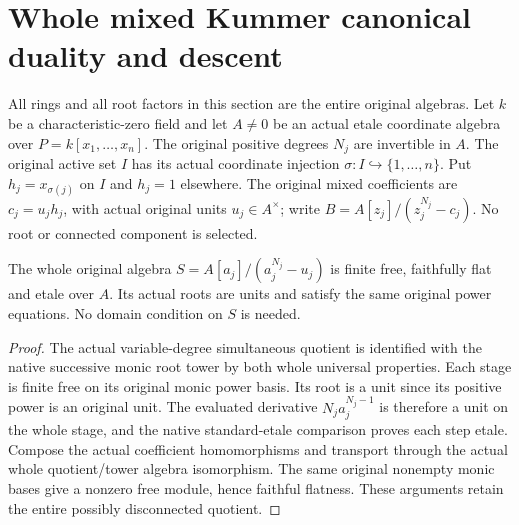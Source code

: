 \section{Whole mixed Kummer canonical duality and descent}
\label{sec:kn-nadel-canonical-mixed}

All rings and all root factors in this section are the entire original
algebras.  Let $k$ be a characteristic-zero field and let $A\ne0$ be an
actual etale coordinate algebra over $P=k[x_1,\ldots,x_n]$.  The original
positive degrees $N_j$ are invertible in $A$.  The original active set
$I$ has its actual coordinate injection $\sigma:I\hookrightarrow\{1,\ldots,n\}$.
Put $h_j=x_{\sigma(j)}$ on $I$ and $h_j=1$ elsewhere.  The original mixed
coefficients are $c_j=u_jh_j$, with actual original units $u_j\in A^\times$;
write $B=A[z_j]/(z_j^{N_j}-c_j)$.  No root or connected component is selected.

\begin{theorem}
\label{thm:kn-nadel-canonical-mixed-unit-cover}
\leanok
{}
The whole original algebra $S=A[a_j]/(a_j^{N_j}-u_j)$ is finite free,
faithfully flat and etale over $A$.  Its actual roots are units and
satisfy the same original power equations.  No domain condition on $S$
is needed.
\end{theorem}
\begin{proof}
The actual variable-degree simultaneous quotient is identified with the
native successive monic root tower by both whole universal properties.
Each stage is finite free on its original monic power basis.  Its root
is a unit since its positive power is an original unit.  The evaluated
derivative $N_ja_j^{N_j-1}$ is therefore a unit on the whole stage, and
the native standard-etale comparison proves each step etale.  Compose
the actual coefficient homomorphisms and transport through the actual
whole quotient/tower algebra isomorphism.  The same original nonempty
monic bases give a nonzero free module, hence faithful flatness.  These
arguments retain the entire possibly disconnected quotient.
\end{proof}

